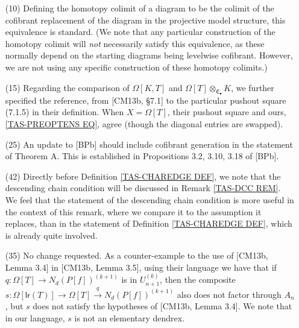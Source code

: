 \documentclass[a4paper,10pt
]{article}%
\numberwithin{equation}{section}
\numberwithin{figure}{section}
\theoremstyle{definition} %
\DeclareMathOperator{\colim}{colim}%
\newcommand{\1}{\ensuremath{\mathbbm 1}}%
\begin{document}
\begin{enumerate}
\item[(10)] Defining the homotopy colimit of a diagram to be the colimit of the cofibrant replacement of the diagram
        in the projective model structure, this equivalence is standard.
        (We note that any particular construction of the homotopy colimit will \textit{not} necessarily satisfy this equivalence, as these normally depend on the starting diagrams being levelwise cofibrant. However, we are not using any specific construction of these homotopy colimits.)
\item[(15)] Regarding the comparison of $\Omega[K,T]$ and $\Omega[T] \otimes_{\mathfrak C_\bullet} K$,
        we further specified the reference, from [CM13b, \S 7.1] to the particular pushout square (7.1.5) in their definition.
        When $X = \Omega[T]$, their pushout square and ours, \eqref{TAS-PREOPTENS EQ}, agree (though the diagonal entries are swapped).
\item[(25)] An update to [BPb] should include cofibrant generation in the statement of Theorem A.
        This is established in Propositions 3.2, 3.10, 3.18 of [BPb].
\item[(42)] Directly before Definition \ref{TAS-CHAREDGE DEF}, we note that the descending chain condition will be discussed in Remark \ref{TAS-DCC REM}.
        We feel that the statement of the descending chain condition is more useful in the context of this remark,
        where we compare it to the assumption it replaces,
        than in the statement of Definition \ref{TAS-CHAREDGE DEF}, which is already quite involved.
\item[(35)] No change requested.
        As a counter-example to the use of [CM13b, Lemma 3.4] in [CM13b, Lemma 3.5], using their language we have that
        if $q \colon \Omega[T] \to N_d(P[f])^{(k+1)}$ is in $U_{n+1}^{(k)}$, then the composite
        $s \colon \Omega[\mathsf{lr}(T)] \to \Omega[T] \xrightarrow{q} N_d(P[f])^{(k+1)}$
        also does not factor through $A_n$,
        but $s$ does not satisfy the hypotheses of [CM13b, Lemma 3.4].
        We note that in our language, $s$ is not an elementary dendrex. 
\end{enumerate}
\end{document}
